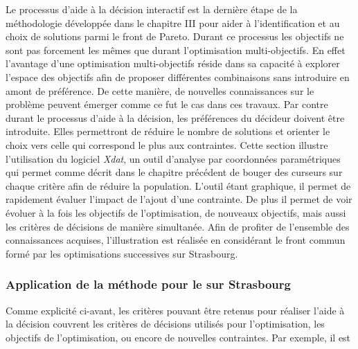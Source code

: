 Le processus d’aide à la décision interactif est la dernière étape de la
méthodologie développée dans le chapitre III pour aider à l’identification et au choix de
solutions parmi le front de Pareto. Durant ce processus les objectifs ne sont pas
forcement les mêmes que durant l’optimisation multi-objectifs. En effet l’avantage d’une
optimisation multi-objectifs réside dans sa capacité à explorer l’espace des objectifs
afin de proposer différentes combinaisons sans introduire en amont de préférence. De cette
manière, de nouvelles connaissances sur le problème peuvent émerger comme ce fut le cas
dans ces travaux. Par contre durant le processus d’aide à la décision, les préférences du
décideur doivent être introduite. Elles permettront de réduire le nombre de solutions et
orienter le choix vers celle qui correspond le plus aux contraintes.
Cette section illustre l’utilisation du logiciel \textit{Xdat}, un outil d’analyse par
coordonnées paramétriques qui permet comme décrit dans le chapitre précédent de bouger des
curseurs sur chaque critère afin de réduire la population. L’outil étant graphique, il
permet de rapidement évaluer l’impact de l’ajout d’une contrainte. De plus il permet de
voir évoluer à la fois les objectifs de l’optimisation, de nouveaux objectifs, mais aussi
les critères de décisions de manière simultanée. Afin de profiter de l’ensemble des
connaissances acquises, l’illustration est réalisée en considérant le front commun formé
par les optimisations successives sur Strasbourg.


\subsubsection{Application de la méthode pour le  sur Strasbourg} %
\label{ssub:application_de_la_méthode_pour_le_ssc_sur_strasbourg}
Comme explicité ci-avant, les critères pouvant être retenus pour réaliser l’aide à la décision
couvrent les critères de décisions utilisés pour l’optimisation, les objectifs de
l’optimisation, ou encore de nouvelles contraintes. Par exemple, il est



